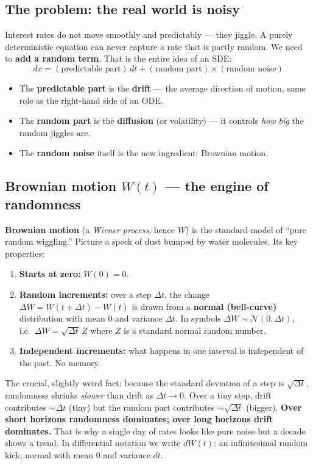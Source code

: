 \documentclass[11pt]{article}
\begin{document}
\subsection{The problem: the real world is noisy}
Interest rates do not move smoothly and predictably --- they jiggle. A purely
deterministic equation can never capture a rate that is partly random. We need to
\textbf{add a random term}. That is the entire idea of an SDE:
\[
  dx = (\text{predictable part})\,dt + (\text{random part}) \times (\text{random noise})
\]
\begin{itemize}[leftmargin=1.4em]
  \item The \textbf{predictable part} is the \textbf{drift} --- the average direction
        of motion, same role as the right-hand side of an ODE.
  \item The \textbf{random part} is the \textbf{diffusion} (or volatility) --- it
        controls \emph{how big} the random jiggles are.
  \item The \textbf{random noise} itself is the new ingredient: Brownian motion.
\end{itemize}

\subsection{Brownian motion $W(t)$ --- the engine of randomness}
\textbf{Brownian motion} (a \emph{Wiener process}, hence $W$) is the standard model
of ``pure random wiggling.'' Picture a speck of dust bumped by water molecules. Its
key properties:
\begin{enumerate}[leftmargin=1.6em]
  \item \textbf{Starts at zero:} $W(0)=0$.
  \item \textbf{Random increments:} over a step $\Delta t$, the change
        $\Delta W = W(t+\Delta t)-W(t)$ is drawn from a \textbf{normal (bell-curve)}
        distribution with mean $0$ and variance $\Delta t$. In symbols
        $\Delta W \sim \mathcal{N}(0,\Delta t)$, i.e.\ $\Delta W = \sqrt{\Delta t}\,Z$
        where $Z$ is a standard normal random number.
  \item \textbf{Independent increments:} what happens in one interval is independent
        of the past. No memory.
\end{enumerate}

The crucial, slightly weird fact: because the standard deviation of a step is
$\sqrt{\Delta t}$, randomness shrinks \emph{slower} than drift as $\Delta t \to 0$.
Over a tiny step, drift contributes $\sim\!\Delta t$ (tiny) but the random part
contributes $\sim\!\sqrt{\Delta t}$ (bigger). \textbf{Over short horizons randomness
dominates; over long horizons drift dominates.} That is why a single day of rates
looks like pure noise but a decade shows a trend. In differential notation we write
$dW(t)$: an infinitesimal random kick, normal with mean $0$ and variance $dt$.
\end{document}
